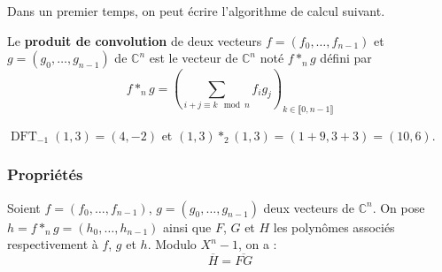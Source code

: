 	Dans un premier temps, on peut écrire l'algorithme de calcul suivant.
	
	
	\begin{definition}
		Le \textbf{produit de convolution} de deux vecteurs $f = (f_0, \dots, f_{n-1})$ et $g = (g_0, \dots, g_{n-1})$ de $\mathbb{C}^n$ est le vecteur de $\mathbb{C}^n$ noté $f *_n g$ défini par
		\[ f *_n g = \left( \sum_{i+j \equiv k \mod n} f_ig_j \right)_{k \in \llbracket 0, n-1 \rrbracket} \]
	\end{definition}
	
	\begin{example}
		$\operatorname{DFT}_{-1}(1,3) = (4, -2)$ et $(1,3) *_2 (1,3) = (1 + 9, 3 + 3) = (10, 6)$.
	\end{example}
	
	\subsubsection{Propriétés}
	
	\begin{proposition}
		\label{transformee-de-fourier-discrete-1}
		Soient $f = (f_0, \dots, f_{n-1})$, $g = (g_0, \dots, g_{n-1})$ deux vecteurs de $\mathbb{C}^n$. On pose $h = f *_n g = (h_0, \dots, h_{n-1})$ ainsi que $F$, $G$ et $H$ les polynômes associés respectivement à $f$, $g$ et $h$. Modulo $X^n - 1$, on a :
		\[ \overline{H} = \overline{FG} \]
	\end{proposition}
	
